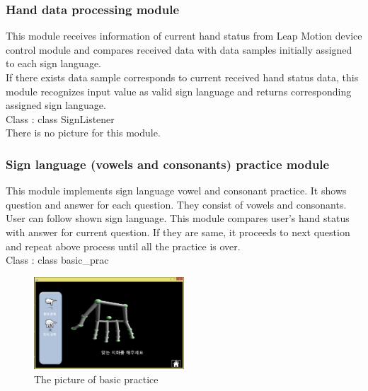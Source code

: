 \documentclass[10pt,journal,compsoc]{IEEEtran}
\begin{document}
\subsubsection{Hand data processing module\\}

This module receives information of current hand status from Leap Motion device control module and compares received data with data samples initially assigned to each sign language.
\\If there exists data sample corresponds to current received hand status data, this module recognizes input value as valid sign language and returns corresponding assigned sign language.
\\Class : class SignListener
\\There is no picture for this module.

\subsubsection{Sign language (vowels and consonants) practice module\\}

This module implements sign language vowel and consonant practice. It shows question and answer for each question. They consist of vowels and consonants. User can follow shown sign language. This module compares user’s hand status with answer for current question. If they are same, it proceeds to next question and repeat above process until all the practice is over.
\\Class : class basic\_prac
\begin{figure}[H]
\centering
\includegraphics[width=0.5\textwidth]{cap_basic_prac.png}
{\caption*{The picture of basic practice}}
\end{figure}
\end{document}
